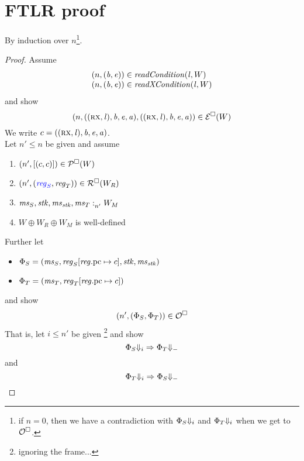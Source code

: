 \documentclass[a4paper]{article}
\begin{document}
\section{FTLR proof}
By induction over $n$\footnote{if $n=0$, then we have a contradiction with $\Phi_S\term[i]$ and $\Phi_T\term[i]$ when we get to $\lro$.}.
\begin{proof}
  Assume
\[
  \begin{array}{l}
  \npair{(\baddr,\eaddr)}\in \readCond{\lin,W}\\
  \npair{(\baddr,\eaddr)}\in \xReadCond{\lin,W}
  \end{array}
\]
and show
\[
\npair{((\rx,\lin),\baddr,\eaddr,\aaddr),
       ((\rx,\lin),\baddr,\eaddr,\aaddr)} \in \lre(W)
\]
We write $c=((\rx,\lin),\baddr,\eaddr,\aaddr)$.\\

Let $n' \leq n$ be given and assume
\begin{enumerate}
\item $\npair[n']{[(c,c)]} \in \lrp(W)$ 
\item $\npair[n']{\stpair{\reg}{\reg}} \in \lrr(W_R)$ \label{item:reg-ass}
\item $\memSat[n']{\ms_S,\stk,\ms_\stk,\ms_T}{W_M}$\label{item:mem-ass}
\item $W \oplus W_R \oplus W_M$ is well-defined\label{item:worlds-def}
\end{enumerate}
Further let
\begin{itemize}
\item $\Phi_S = (\ms_S,\reg_S\updReg{\pcreg}{c},\stk,\ms_\stk)$
\item $\Phi_T = (\ms_T,\reg_T\updReg{\pcreg}{c})$
\end{itemize}
and show
\[
  \npair[n']{(\Phi_S,\Phi_T)} \in \lro
\]
That is, let $i \leq n'$ be given \footnote{ignoring the frame...} and show
\[
  \Phi_S \term[i] \Rightarrow \Phi_T \term
\]
and 
\[
  \Phi_T \term[i] \Rightarrow \Phi_S \term
\]


\end{proof}
\end{document}
